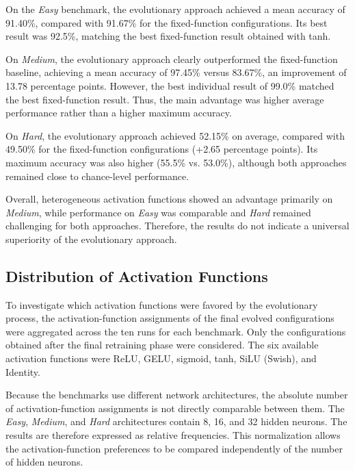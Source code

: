 \documentclass[12pt,fleqn,a4paper]{article}
\begin{document}
On the \textit{Easy} benchmark, the evolutionary approach achieved a mean accuracy of 91.40\%, compared with 91.67\% for the fixed-function configurations. Its best result was 92.5\%, matching the best fixed-function result obtained with tanh.

On \textit{Medium}, the evolutionary approach clearly outperformed the fixed-function baseline, achieving a mean accuracy of 97.45\% versus 83.67\%, an improvement of 13.78 percentage points. However, the best individual result of 99.0\% matched the best fixed-function result. Thus, the main advantage was higher average performance rather than a higher maximum accuracy.

On \textit{Hard}, the evolutionary approach achieved 52.15\% on average, compared with 49.50\% for the fixed-function configurations (+2.65 percentage points). Its maximum accuracy was also higher (55.5\% vs. 53.0\%), although both approaches remained close to chance-level performance.

Overall, heterogeneous activation functions showed an advantage primarily on \textit{Medium}, while performance on \textit{Easy} was comparable and \textit{Hard} remained challenging for both approaches. Therefore, the results do not indicate a universal superiority of the evolutionary approach.\newpage
\subsection{Distribution of Activation Functions}

To investigate which activation functions were favored by the evolutionary process, the activation-function assignments of the final evolved configurations were aggregated across the ten runs for each benchmark. Only the configurations obtained after the final retraining phase were considered. The six available activation functions were ReLU, GELU, sigmoid, tanh, SiLU (Swish), and Identity.

Because the benchmarks use different network architectures, the absolute number of activation-function assignments is not directly comparable between them. The \textit{Easy}, \textit{Medium}, and \textit{Hard} architectures contain 8, 16, and 32 hidden neurons. The results are therefore expressed as relative frequencies. This normalization allows the activation-function preferences to be compared independently of the number of hidden neurons.
\end{document}
